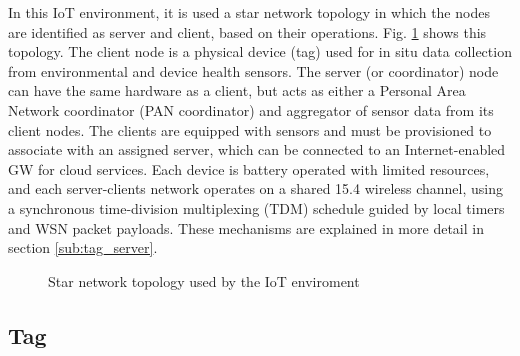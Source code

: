 \documentclass[journal]{IEEEtran}	%
\begin{document}
In this IoT environment, it is used a star network topology in which the nodes are identified as server and client, based on their operations. Fig. \ref{fig:topology} shows this topology. The client node is a physical device (tag) used for in situ data collection from environmental and device health sensors. The server (or coordinator) node can have the same hardware as a client, but acts as either a Personal Area Network coordinator (PAN coordinator) and aggregator of sensor data from its client nodes. The clients are equipped with sensors and must be provisioned to associate with an assigned server, which can be connected to an Internet-enabled GW for cloud services. Each device is battery operated with limited resources, and each server-clients network operates on a shared 15.4 wireless channel, using a synchronous time-division multiplexing (TDM) schedule guided by local timers and WSN packet payloads. These mechanisms are explained in more detail in section \ref{sub:tag_server}.

\begin{figure}[t!]
    \centering
    \caption{Star network topology used by the IoT enviroment}
    \label{fig:topology}
\end{figure}


\subsection{Tag}
\end{document}
